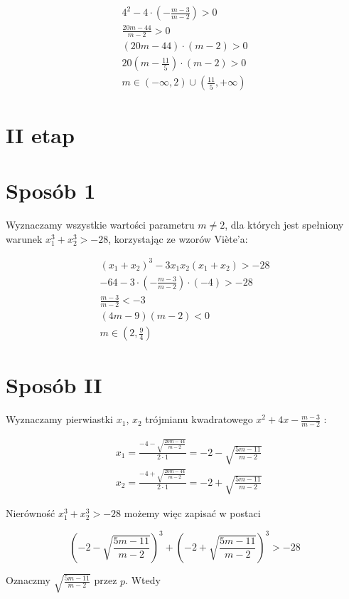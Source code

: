 \documentclass[10pt]{article}
\begin{document}
$$
\begin{gathered}
4^{2}-4 \cdot\left(-\frac{m-3}{m-2}\right)>0 \\
\frac{20 m-44}{m-2}>0 \\
(20 m-44) \cdot(m-2)>0 \\
20\left(m-\frac{11}{5}\right) \cdot(m-2)>0 \\
m \in(-\infty, 2) \cup\left(\frac{11}{5},+\infty\right)
\end{gathered}
$$

\section*{II etap}
\section*{Sposób 1}
Wyznaczamy wszystkie wartości parametru $m \neq 2$, dla których jest spełniony warunek $x_{1}^{3}+x_{2}^{3}>-28$, korzystając ze wzorów Viète'a:

$$
\begin{gathered}
\left(x_{1}+x_{2}\right)^{3}-3 x_{1} x_{2}\left(x_{1}+x_{2}\right)>-28 \\
-64-3 \cdot\left(-\frac{m-3}{m-2}\right) \cdot(-4)>-28 \\
\frac{m-3}{m-2}<-3 \\
(4 m-9)(m-2)<0 \\
m \in\left(2, \frac{9}{4}\right)
\end{gathered}
$$

\section*{Sposób II}
Wyznaczamy pierwiastki $x_{1}$, $x_{2}$ trójmianu kwadratowego $x^{2}+4 x-\frac{m-3}{m-2}$ :

$$
\begin{aligned}
& x_{1}=\frac{-4-\sqrt{\frac{20 m-44}{m-2}}}{2 \cdot 1}=-2-\sqrt{\frac{5 m-11}{m-2}} \\
& x_{2}=\frac{-4+\sqrt{\frac{20 m-44}{m-2}}}{2 \cdot 1}=-2+\sqrt{\frac{5 m-11}{m-2}}
\end{aligned}
$$

Nierówność $x_{1}^{3}+x_{2}^{3}>-28$ możemy więc zapisać w postaci

$$
\left(-2-\sqrt{\frac{5 m-11}{m-2}}\right)^{3}+\left(-2+\sqrt{\frac{5 m-11}{m-2}}\right)^{3}>-28
$$

Oznaczmy $\sqrt{\frac{5 m-11}{m-2}}$ przez $p$. Wtedy
\end{document}
